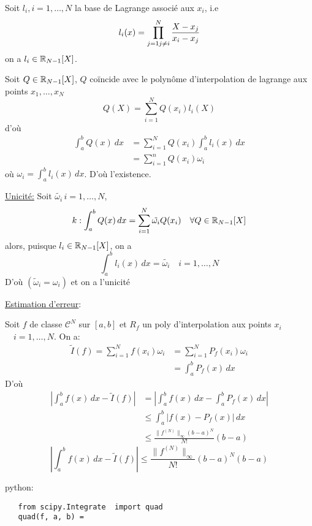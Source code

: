 \begin{preuve}
   Soit $l_i, i = 1, \ldots, N$  la base de Lagrange associé aux $x_i$, i.e
    \[
        l_i(x) = \prod_{\substack{j=1}\\ \substack{j\neq i}}^{N}  \frac{X - x_j}{x_i - x_j} 
   \] 
   on a $l_i \in \mathbb{R}_{N-1}[X]$.
   \par
   Soit $Q \in \mathbb{R}_{N-1}[X]$, $Q$ coïncide avec le polynôme d'interpolation de lagrange aux points  $x_1, \ldots, x_N$
   \[
   Q(X) = \sum_{i=1}^{N} Q(x_i)l_i(X)
   \] 
   d'où
   \begin{align*}
       \int_{{a}}^{{b}} {Q(x)} \: d{x} &= \sum_{i=1}^{N} Q(x_i)\int_{a}^{b} l_i(x) \, d{x}\\ 
                                       &= \sum_{i=1}^{n} Q(x_i)\omega_i
   \end{align*}
   où $\omega_i = \int_{a}^{b} l_i(x) \, d{x} $. D'où l'existence.\par
   \underline{Unicité:}
   Soit $\tilde{\omega_i} \, i = 1, \ldots, N$, 
   \[
       k: \int_{a}^{b} Q(x) \, d{x} = \sum_{i=1}^{N} \tilde{\omega_i}Q(x_i) \quad \forall Q \in \mathbb{R}_{N-1}[X] 
   \] 
   alors, puisque $l_i \in \mathbb{R}_{N-1}[X]$, on a
   \[
       \int_{a}^{b} l_i(x) \, d{x} = \tilde{\omega_i} \quad i = 1, \ldots, N 
   \] 
   D'où $(\tilde{\omega}_i = \omega_i)$ et on a l'unicité

   \par
   \underline{Estimation d'erreur}:
   \par
   Soit $f$ de classe  $\mathcal{C}^N$ sur  $[a, b]$ et  $R_f$ un poly d'interpolation aux points  $x_i$  $\quad i = 1, \ldots, N$. On a:
   \begin{align*}
       \tilde{I}(f) = \sum_{i=1}^{N} f(x_i)\omega_i &= \sum_{i=1}^{N} P_f(x_i)\omega_i\\
                                                    &= \int_{a}^{b} P_f(x) \, d{x} 
   \end{align*}
   D'où 
   \begin{align*}
       \left| \int_{a}^{b} f(x) \, d{x} - \tilde{I}(f) \right| &= \left| \int_{a}^{b} f(x) \, d{x} - \int_{a}^{b} P_f(x) \, d{x}   \right| \\
                                                               &\le \int_{a}^{b} |f(x) - P_f(x)| \, d{x} \\
                                                               &\le \frac{\|f^{(N)}\|_{\infty}(b-a)^N}{N!}(b-a)
   \end{align*}
   \[
       \left| \int_{a}^{b} f(x) \, d{x} - \tilde{I}(f)  \right| \le \frac{\|f^{(N)}\|_{\infty}}{N!}(b-a)^N(b-a)
   \] 
\end{preuve}

python:
\begin{lstlisting}
   from scipy.Integrate  import quad
   quad(f, a, b) = 
\end{lstlisting}

